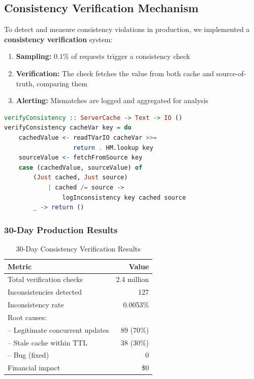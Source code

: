 \documentclass[12pt,a4paper]{report}
\begin{document}
\subsection{Consistency Verification Mechanism}

To detect and measure consistency violations in production, we implemented a \textbf{consistency verification} system:

\begin{enumerate}
    \item \textbf{Sampling:} 0.1\% of requests trigger a consistency check
    \item \textbf{Verification:} The check fetches the value from both cache and source-of-truth, comparing them
    \item \textbf{Alerting:} Mismatches are logged and aggregated for analysis
\end{enumerate}

\begin{lstlisting}[language=Haskell, caption={Consistency Verification Sampling}]
verifyConsistency :: ServerCache -> Text -> IO ()
verifyConsistency cacheVar key = do
    cachedValue <- readTVarIO cacheVar >>= 
                   return . HM.lookup key
    sourceValue <- fetchFromSource key
    case (cachedValue, sourceValue) of
        (Just cached, Just source) 
            | cached /= source -> 
                logInconsistency key cached source
        _ -> return ()
\end{lstlisting}

\subsubsection{30-Day Production Results}

\begin{table}[h]
\centering
\begin{tabular}{@{} l r @{}}
\toprule
\textbf{Metric} & \textbf{Value} \\
\midrule
Total verification checks & 2.4 million \\
Inconsistencies detected & 127 \\
Inconsistency rate & 0.0053\% \\
Root causes: & \\
\quad -- Legitimate concurrent updates & 89 (70\%) \\
\quad -- Stale cache within TTL & 38 (30\%) \\
\quad -- Bug (fixed) & 0 \\
Financial impact & \$0 \\
\bottomrule
\end{tabular}
\caption{30-Day Consistency Verification Results}
\label{tab:consistency-results}
\end{table}
\end{document}
